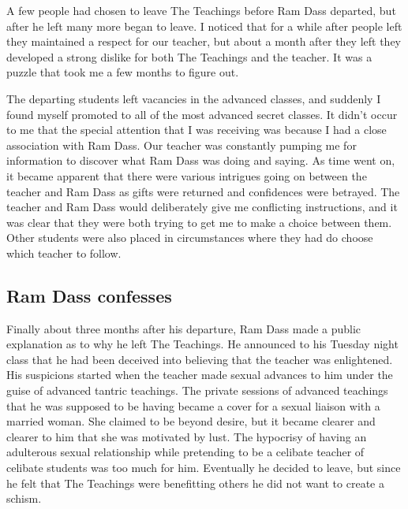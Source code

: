\documentclass[a5paper,10pt,english]{book}
\begin{document}
\sphinxAtStartPar
A few people had chosen to leave The Teachings before Ram Dass departed,
but after he left many more began to leave. I noticed that for a while
after people left they maintained a respect for our teacher, but about a
month after they left they developed a strong dislike for both The
Teachings and the teacher. It was a puzzle that took me a few months to
figure out.

\sphinxAtStartPar
The departing students left vacancies in the advanced classes, and
suddenly I found myself promoted to all of the most advanced secret
classes. It didn’t occur to me that the special attention that I was
receiving was because I had a close association with Ram Dass. Our
teacher was constantly pumping me for information to discover what Ram
Dass was doing and saying. As time went on, it became apparent that
there were various intrigues going on between the teacher and Ram Dass
as gifts were returned and confidences were betrayed. The teacher and
Ram Dass would deliberately give me conflicting instructions, and it was
clear that they were both trying to get me to make a choice between
them. Other students were also placed in circumstances where they had do
choose which teacher to follow.


\subsection{Ram Dass confesses}
\label{\detokenize{psychopaths:ram-dass-confesses}}
\sphinxAtStartPar
Finally about three months after his departure, Ram Dass made a public
explanation as to why he left The Teachings. He announced to his Tuesday
night class that he had been deceived into believing that the teacher
was enlightened. His suspicions started when the teacher made sexual
advances to him under the guise of advanced tantric teachings. The
private sessions of advanced teachings that he was supposed to be having
became a cover for a sexual liaison with a married woman. She claimed to
be beyond desire, but it became clearer and clearer to him that she was
motivated by lust. The hypocrisy of having an adulterous sexual
relationship while pretending to be a celibate teacher of celibate
students was too much for him. Eventually he decided to leave, but since
he felt that The Teachings were benefitting others he did not want to
create a schism.
\end{document}
